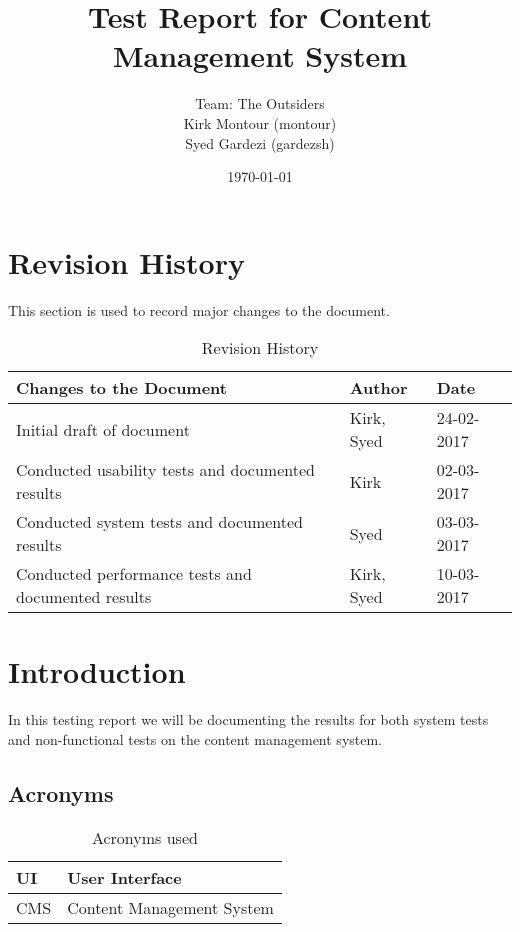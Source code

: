 \documentclass[12pt]{article}
\begin{document}
\title{Test Report for Content Management System} 
\author{Team: The Outsiders\\ Kirk Montour (montour)\\ Syed Gardezi (gardezsh)}
\date{\today}
  
\maketitle



\pagebreak

\tableofcontents

\pagebreak

\section{Revision History}
This section is used to record major changes to the document.
\begin{table}[H]
\centering
\caption{Revision History}
\begin{tabular}{|l|l|l|}
\hline
Changes to the Document                          & Author     & Date       \\ \hline
Initial draft of document                        & Kirk, Syed & 24-02-2017 \\ \hline
Conducted usability tests and documented results & Kirk       & 02-03-2017 \\ \hline
Conducted system tests and documented results    & Syed       & 03-03-2017 \\ \hline
Conducted performance tests and documented results    & Kirk, Syed & 10-03-2017 \\ \hline
\end{tabular}
\end{table}

\listoftables

\section{Introduction}
In this testing report we will be documenting the results for both
system tests and non-functional tests on the content management system.

\subsection{Acronyms}

\begin{table}[h]
\centering
\caption{Acronyms used}
\label{my-label}
\begin{tabular}{|l|l|}
\hline
UI  & User Interface            \\ \hline
CMS & Content Management System \\ \hline
\end{tabular}
\end{table}
\end{document}
